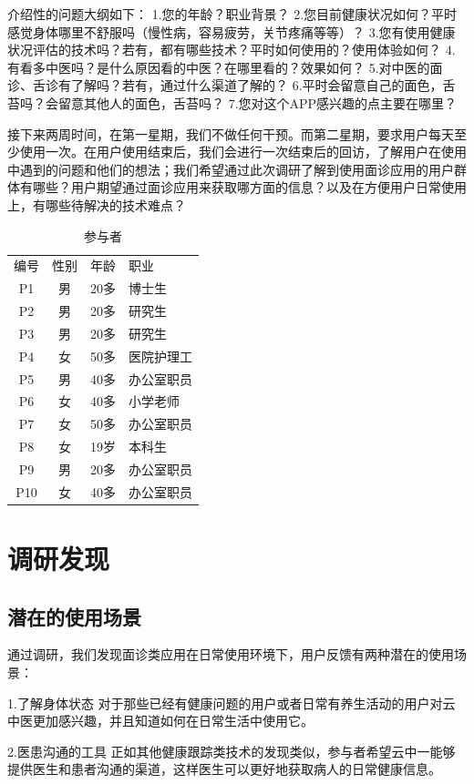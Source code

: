 介绍性的问题大纲如下：
1.您的年龄？职业背景？
2.您目前健康状况如何？平时感觉身体哪里不舒服吗（慢性病，容易疲劳，关节疼痛等等）？
3.您有使用健康状况评估的技术吗？若有，都有哪些技术？平时如何使用的？使用体验如何？
4.有看多中医吗？是什么原因看的中医？在哪里看的？效果如何？
5.对中医的面诊、舌诊有了解吗？若有，通过什么渠道了解的？
6.平时会留意自己的面色，舌苔吗？会留意其他人的面色，舌苔吗？
7.您对这个APP感兴趣的点主要在哪里？

接下来两周时间，在第一星期，我们不做任何干预。而第二星期，要求用户每天至少使用一次。在用户使用结束后，我们会进行一次结束后的回访，了解用户在使用中遇到的问题和他们的想法；我们希望通过此次调研了解到使用面诊应用的用户群体有哪些？用户期望通过面诊应用来获取哪方面的信息？以及在方便用户日常使用上，有哪些待解决的技术难点？

\begin{table}
  \caption{参与者}
  \centering
  \label{tab:Participants}
  \begin{tabular}{cccl}
编号 &	性别 &	年龄 &	职业 \\
P1 &	男 &	20多 &	博士生 \\
P2 &	男 &	20多 &	研究生 \\
P3 &	男 &	20多 &	研究生 \\
P4 &	女 &	50多 &	医院护理工 \\
P5 &	男 &	40多 &	办公室职员 \\
P6 &	女 &	40多 &	小学老师 \\
P7 &	女 &	50多 &	办公室职员 \\
P8 &	女 &	19岁 &	本科生 \\
P9 &	男 &	20多 &	办公室职员 \\
P10 &	女 &	40多 &	办公室职员 \\
  \end{tabular}
\end{table}


\section{调研发现}
\subsection{潜在的使用场景}
通过调研，我们发现面诊类应用在日常使用环境下，用户反馈有两种潜在的使用场景：

1.了解身体状态
对于那些已经有健康问题的用户或者日常有养生活动的用户对云中医更加感兴趣，并且知道如何在日常生活中使用它。

2.医患沟通的工具
正如其他健康跟踪类技术的发现类似，参与者希望云中一能够提供医生和患者沟通的渠道，这样医生可以更好地获取病人的日常健康信息。

